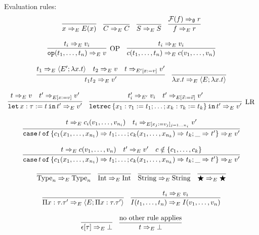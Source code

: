 \documentclass[
    9pt,            %
    techreport,        %
    affiltop,       %
]{art}
\begin{document}
Evaluation rules:
\[
\begin{array}{c}
\infer{\eval{x}{E}{E(x)}}{}\quad
\infer{\eval{C}{E}{C}}{}\quad
\infer{\eval{S}{E}{S}}{}\quad
\infer{\eval{f}{E}{r}}{\eval{\Fc(f)}{\emptyset}{r}}
\\ \\
\infer[\mathrm{OP}]{\eval{\op(t_1,\ldots,t_n)}{E}{v}}{\eval{t_i}{E}{v_i}}\quad
\infer{\eval{c(t_1,\ldots,t_n)}{E}{c(v_1,\ldots,v_n)}}{\eval{t_i}{E}{v_i}}
\\ \\
\infer{\eval{t_1 t_2}{E}{v'}}{\eval{t_1}{E}{\closure{E'}{\lambda x . t}} & \eval{t_2}{E}{v} & \eval{t}{E'[x:=v]}{v'}} \quad
\infer{\eval{\lambda x . t}{E}{\closure{E}{\lambda x . t}}}{}
\\ \\
\infer{\eval{\slet{x:\tau := t}{t'}}{E}{v'}}{\eval{t}{E}{v} & \eval{t'}{E[x:=v]}{v'}}\quad
\infer[\mathrm{LR}]{\eval{\sletrec{\{x_1 : \tau_1 := t_1; \ldots; x_k : \tau_k := t_k\}}{t'}}{E}{v'}}{\eval{t_i'}{E'}{v_i} & \eval{t'}{E[\vec{x}:=\vec{v}]}{v'}}
\\ \\
\infer{\eval{\scase{t}{\{c_1(x_1,\ldots,x_{n_1}) \To t_1; \ldots; c_k(x_1,\ldots,x_{n_k}) \To t_k; \_ \To t'\}}}{E}{v'}}{\eval{t}{E}{c_i(v_1,\ldots,v_{n_i})} & \eval{t_i}{E[x_j := v_j]_{j=1\ldots n_i}}{v'}}
\\ \\
\infer{\eval{\scase{t}{\{c_1(x_1,\ldots,x_{n_1}) \To t_1; \ldots; c_k(x_1,\ldots,x_{n_k}) \To t_k; \_ \To t'\}}}{E}{v'}}{\eval{t}{E}{c(v_1,\ldots,v_n)} & \eval{t'}{E}{v'} & c \notin \{c_1,\ldots,c_k\}}
\\ \\
\infer{\eval{\Type_n}{E}{\Type_n}}{}\quad
\infer{\eval{\Int}{E}{\Int}}{}\quad
\infer{\eval{\String}{E}{\String}}{}\quad
\infer{\eval{\Dynamic}{E}{\Dynamic}}{}
\\ \\
\infer{\eval{\Pi x : \tau . \tau'}{E}{\closure{E}{\Pi x : \tau . \tau'}}}{}\quad
\infer{\eval{I(t_1,\ldots,t_n)}{E}{I(v_1,\ldots,v_n)}}{\eval{t_i}{E}{v_i}}
\\ \\
\infer{\eval{\epsilon[\tau]}{E}{\bot}}{}\quad
\infer{\eval{t}{E}{\bot}}{\text{no other rule applies}}
\end{array}
\]
\end{document}
